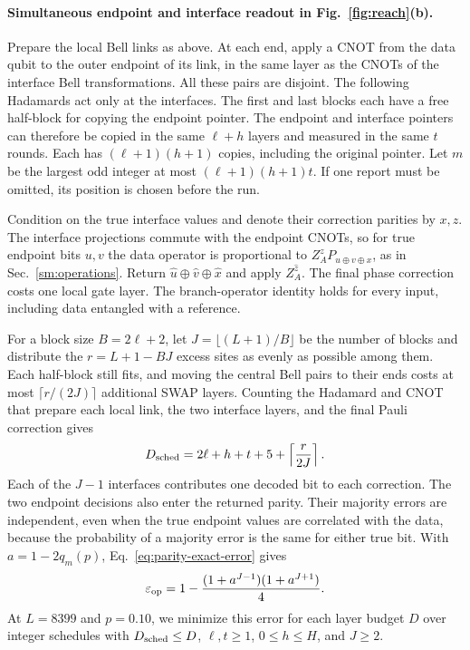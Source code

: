 \documentclass[aps,prl,twocolumn,superscriptaddress,longbibliography,reprint,floatfix]{revtex4-2}
\newcommand{\eps}{\varepsilon}
\begin{document}
\paragraph*{Simultaneous endpoint and interface readout in Fig.~\ref{fig:reach}(b).}
Prepare the local Bell links as above. At each end, apply a CNOT
from the data qubit to the outer endpoint of its link, in the same layer
as the CNOTs of the interface Bell transformations. All these pairs
are disjoint. The following Hadamards act only at the interfaces.
The first and last blocks each have a free half-block for copying the
endpoint pointer. The endpoint and interface pointers can therefore
be copied in the same $\ell+h$ layers and measured in the same $t$
rounds. Each has $(\ell+1)(h+1)$ copies, including the original
pointer. Let $m$ be the largest odd integer at most $(\ell+1)(h+1)t$.
If one report must be omitted, its position is chosen before the run.

Condition on the true interface values and denote their correction
parities by $x,z$. The interface projections commute with the endpoint
CNOTs, so for true endpoint bits $u,v$ the data operator is proportional
to $Z_A^z P_{u\oplus v\oplus x}$, as in Sec.~\ref{sm:operations}.
Return $\hat u\oplus\hat v\oplus\hat x$ and apply $Z_A^{\hat z}$.
The final phase correction costs one local gate layer. The branch-operator
identity holds for every input, including data entangled with a reference.

For a block size $B=2\ell+2$, let $J=\lfloor(L+1)/B\rfloor$ be the number
of blocks and distribute the $r=L+1-BJ$ excess sites as evenly as
possible among them. Each half-block still fits, and moving the central
Bell pairs to their ends costs at most $\lceil r/(2J)\rceil$ additional
SWAP layers. Counting the Hadamard and CNOT that prepare each local link,
the two interface layers, and the final Pauli correction gives
\begin{equation}
 D_{\rm sched}=2\ell+h+t+5+\left\lceil\frac{r}{2J}\right\rceil .
 \label{eq:comb-fixed-distance-schedule}
\end{equation}
Each of the $J-1$ interfaces contributes one decoded bit to each
correction. The two endpoint decisions also enter the returned parity.
Their majority errors are independent, even when the true endpoint
values are correlated with the data, because the probability of a
majority error is the same for either true bit. With $a=1-2q_m(p)$,
Eq.~\eqref{eq:parity-exact-error} gives
\[
 \eps_{\rm op}=1-\frac{(1+a^{J-1})(1+a^{J+1})}{4}.
\]
At $L=8399$ and $p=0.10$, we minimize this error for each layer budget
$D$ over integer schedules with $D_{\rm sched}\le D$,
$\ell,t\ge1$, $0\le h\le H$, and $J\ge2$.
\end{document}
